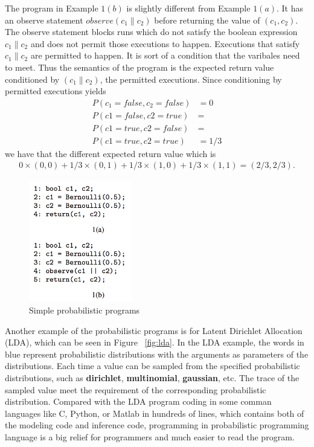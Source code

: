 The program in Example $1(b)$ is slightly different from Example $1(a)$. It has an observe statement $observe(c_1 \| c_2)$ before returning the value of $(c_1,c_2)$. The observe statement blocks runs which do not satisfy the boolean expression $c_1 \| c_2$ and does not permit those executions to happen. Executions that satisfy $c_1 \| c_2$ are permitted to happen. It is sort of a condition that the varibales need to meet. Thus the semantics of the program is the expected return value conditioned by $(c_1 \| c_2)$, the permitted executions. Since conditioning by permitted executions yields
\begin{align*}
  P(c_1=false,c_2=false) &= 0 \\
  P(c1=false,c2=true) &= \\
  P(c1=true,c2=false) &= \\
  P(c1=true,c2=true) &= 1/3
\end{align*}
we have that the different expected return value which is 
\begin{align*}
  0 \times (0,0) + 1/3 \times (0,1) + 1/3 \times (1,0) + 1/3 \times (1,1) = (2/3,2/3).
\end{align*}

\begin{figure}
    \centering
    \includegraphics[width=0.4\textwidth]{figures/pp_simple_eg.png}
    \caption{Simple probabilistic programs}
    \label{fig:pp_simple_eg}
\end{figure}

Another example of the probabilistic programs is for Latent Dirichlet Allocation (LDA), which can be seen in Figure ~\ref{fig:lda}. In the LDA example, the words in blue represent probabilistic distributions with the arguments as parameters of the distributions. Each time a value can be sampled from the specified probabilistic distributions, such as \textbf{dirichlet}, \textbf{multinomial}, \textbf{gaussian}, etc. The trace of the sampled value meet the requirement of the corresponding probabilistic distribution. Compared with the LDA program coding in some comman languages like C, Python, or Matlab in hundreds of lines, which contains both of the modeling code and inference code, programming in probabilistic programming language is a big relief for programmers and much easier to read the program.

